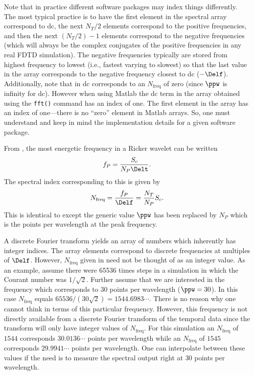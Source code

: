 Note that in practice different software packages may index things
differently.  The most typical practice is to have the first element
in the spectral array correspond to dc, the next $N_T/2$ elements
correspond to the positive frequencies, and then the next $(N_T/2)-1$
elements correspond to the negative frequencies (which will always be
the complex conjugates of the positive frequencies in any real FDTD
simulation).  The negative frequencies typically are stored from
highest frequency to lowest (i.e., fastest varying to slowest) so that
the last value in the array corresponds to the negative frequency
closest to dc ($-\Delf$).  Additionally, note that in 
 dc corresponds to an $N_{\mathrm{freq}}$ of
zero (since $\ppw$ is infinity for dc).  However when using Matlab the
dc term in the array obtained using the {\tt fft()} command has an
index of one.  The first element in the array has an index of
one---there is no ``zero'' element in Matlab arrays.  So, one must
understand and keep in mind the implementation details for a given
software package.

From , the most energetic frequency in a Ricker
wavelet can be written
\begin{equation}
  f_P = \frac{S_c}{N_P \Delt}.
\end{equation}
The spectral index corresponding to this is given by
\begin{equation}
  N_{\mathrm{freq}} = \frac{f_P}{\Delf} 
  = \frac{N_T}{N_P}S_c.
\end{equation}
This is identical to  except the generic value
$\ppw$ has been replaced by $N_P$ which is the points per
wavelength at the peak frequency.

A discrete Fourier transform yields an array of numbers which
inherently has integer indices.  The array elements correspond to
discrete frequencies at multiples of $\Delf$.  However,
$N_{\mathrm{freq}}$ given in  need not be
thought of as an integer value.  As an example, assume there were
65536 times steps in a simulation in which the Courant number was
$1/\sqrt{2}$.  Further assume that we are interested in the frequency
which corresponds to $30$ points per wavelength ($\ppw=30$).  In this
case $N_{\mathrm{freq}}$ equals $65536/(30\sqrt{2}) = 1544.6983\cdots$.
There is no reason why one cannot think in terms of this particular
frequency.  However, this frequency is not directly available from a
discrete Fourier transform of the temporal data since the transform
will only have integer values of $N_{\mathrm{freq}}$.  For this
simulation an $N_{\mathrm{freq}}$ of $1544$ corresponds
$30.0136\cdots$ points per wavelength while an $N_{\mathrm{freq}}$ of
$1545$ corresponds $29.9941\cdots$ points per wavelength.  One can
interpolate between these values if the need is to measure the
spectral output right at $30$ points per wavelength.  

